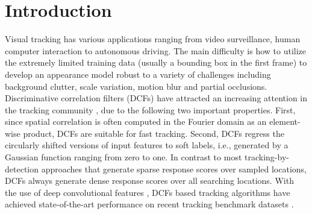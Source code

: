 \documentclass[10pt,twocolumn,letterpaper]{article}
\newcommand{\ryn}[1]{{\color{black}{#1}}}
\begin{document}
\section{Introduction}
Visual tracking has various applications ranging from video surveillance, human computer interaction to autonomous driving. The main difficulty is how to utilize the extremely limited training data (usually a bounding box in the first frame) to develop an appearance model robust to a variety of challenges including background clutter, scale variation, motion blur and partial occlusions. Discriminative correlation filters (DCFs) have attracted an increasing attention in the tracking community \cite{bolme-cvpr10-mosse,Danelljan-iccvw15-DeepSRDCF,chao-iccv15-HCF}, due to the following two important properties. First, since spatial correlation is often computed in the Fourier domain as an element-wise product, DCFs are suitable for fast tracking. Second, DCFs regress the circularly shifted versions of input features to soft labels, i.e., generated by a Gaussian function ranging from zero to one. In contrast to most \ryn{existing} tracking-by-detection approaches \cite{kalal-pami12-tld,bai-iccv13-randomized,hare-pami16-struck,ning-cvpr16-dlsvm} that generate sparse response scores over sampled locations, DCFs always generate dense response scores over all searching locations. With the use of deep convolutional features \cite{krizhevsky-nips12-imagenet}, DCFs based tracking algorithms \cite{chao-iccv15-HCF,Danelljan-iccvw15-DeepSRDCF,martin-eccv16-beyond} have achieved state-of-the-art performance on recent tracking benchmark datasets \cite{wu-cvpr13-otb,wu-pami15-otb,kristan-eccvw16-vot}.
\end{document}
